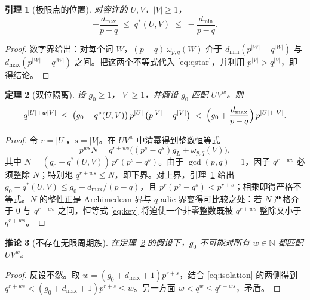 \documentclass[11pt,a4paper]{article}
\newtheorem{theorem}{定理}[section]
\newtheorem{lemma}[theorem]{引理}
\newtheorem{corollary}[theorem]{推论}
\theoremstyle{remark}
\newcommand{\N}{\mathbb{N}}
\begin{document}
\begin{lemma}[极限点的位置]
\label{lem:qstar}
对容许的 $U, V$，$|V| \ge 1$，
\[
  -\frac{d_{\max}}{p-q} \;\le\; q^{*}(U,V) \;\le\; -\frac{d_{\min}}{p-q}.
\]
\end{lemma}

\begin{proof}
数字界给出：对每个词 $W$，$(p-q)\, \omega_{p,q}(W)$ 介于 $d_{\min}(p^{|W|} - q^{|W|})$ 与 $d_{\max}(p^{|W|} - q^{|W|})$ 之间。把这两个不等式代入 \eqref{eq:qstar}，并利用 $p^{|V|} > q^{|V|}$，即得结论。
\end{proof}

\begin{theorem}[双位隔离]
\label{thm:isolation}
设 $g_{0} \ge 1$，$|V| \ge 1$，并假设 $g_{0}$ 匹配 $U V^{w}$。则
\begin{equation}
  q^{|U| + w|V|} \;\le\; \bigl(g_{0} - q^{*}(U,V)\bigr)\, p^{|U|}\, \bigl(p^{|V|} - q^{|V|}\bigr)
  \;<\; \Bigl(g_{0} + \frac{d_{\max}}{p-q}\Bigr)\, p^{|U| + |V|}.
  \label{eq:isolation}
\end{equation}
\end{theorem}

\begin{proof}
令 $r = |U|$，$s = |V|$。在 $U V^{w}$ 中清幂得到整数恒等式
\begin{equation}
  p^{ws} N = q^{r + ws} \bigl((p^{s} - q^{s}) g_{L} + \omega_{p,q}(V)\bigr),
  \label{eq:key}
\end{equation}
其中 $N = (g_{0} - q^{*}(U,V))\, p^{r} (p^{s} - q^{s})$。由于 $\gcd(p,q) = 1$，因子 $q^{r+ws}$ 必须整除 $N$；特别地 $q^{r+ws} \le N$，即下界。对上界，引理~\ref{lem:qstar} 给出 $g_{0} - q^{*}(U,V) \le g_{0} + d_{\max}/(p-q)$，且 $p^{r}(p^{s} - q^{s}) < p^{r+s}$；相乘即得严格不等式。$N$ 的整性正是 Archimedean 界与 $q$-adic 界变得可比较之处：若 $N$ 严格介于 $0$ 与 $q^{r+ws}$ 之间，恒等式 \eqref{eq:key} 将迫使一个非零整数既被 $q^{r+ws}$ 整除又小于 $q^{r+ws}$。
\end{proof}

\begin{corollary}[不存在无限周期族]
\label{cor:noinf}
在定理~\ref{thm:isolation} 的假设下，$g_{0}$ 不可能对所有 $w \in \N$ 都匹配 $U V^{w}$。
\end{corollary}

\begin{proof}
反设不然。取 $w = (g_{0} + d_{\max} + 1) p^{r+s}$，结合 \eqref{eq:isolation} 的两侧得到 $q^{r+ws} < (g_{0} + d_{\max} + 1) p^{r+s} \le w$。另一方面 $w < q^{w} \le q^{r+ws}$，矛盾。
\end{proof}
\end{document}

